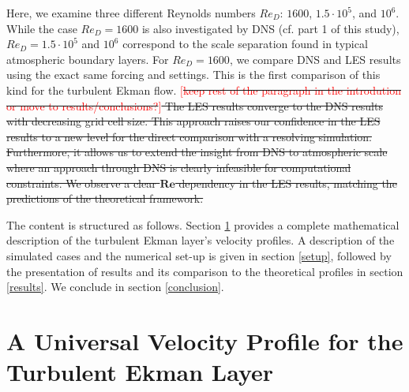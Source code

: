 \documentclass[smallcondensed,draft]{svjour3} %
\newcommand{\todo}[1]{\textcolor{red}{$[$#1$]$}}
\newcommand{\RE}{\mathbf{Re}}
\providecommand{\DIFadd}[1]{{\protect\color{blue}\uwave{#1}}} %
\providecommand{\DIFdel}[1]{{\protect\color{red}\sout{#1}}}                      %
\providecommand{\DIFaddbegin}{} %
\providecommand{\DIFaddend}{} %
\providecommand{\DIFdelbegin}{} %
\providecommand{\DIFdelend}{} %
\newcommand{\DIFscaledelfig}{0.5}
\newlength{\DIFdelgraphicswidth} %
\newlength{\DIFdelgraphicsheight} %
\newcommand{\DIFaddincludegraphics}[2][]{{\color{blue}\fbox{\DIFOincludegraphics[#1]{#2}}}} %
\newcommand{\DIFdelincludegraphics}[2][]{%
\sbox{\DIFdelgraphicsbox}{\DIFOincludegraphics[#1]{#2}}%
\settoboxwidth{\DIFdelgraphicswidth}{\DIFdelgraphicsbox} %
\settoboxtotalheight{\DIFdelgraphicsheight}{\DIFdelgraphicsbox} %
\scalebox{\DIFscaledelfig}{%
\parbox[b]{\DIFdelgraphicswidth}{\usebox{\DIFdelgraphicsbox}\\[-\baselineskip] \rule{\DIFdelgraphicswidth}{0em}}\llap{\resizebox{\DIFdelgraphicswidth}{\DIFdelgraphicsheight}{%
\setlength{\unitlength}{\DIFdelgraphicswidth}%
\begin{picture}(1,1)%
\thicklines\linethickness{2pt} %
{\color[rgb]{1,0,0}\put(0,0){\framebox(1,1){}}}%
{\color[rgb]{1,0,0}\put(0,0){\line( 1,1){1}}}%
{\color[rgb]{1,0,0}\put(0,1){\line(1,-1){1}}}%
\end{picture}%
}\hspace*{3pt}}} %
} %
\DeclareRobustCommand{\DIFaddbegin}{\DIFOaddbegin \let\includegraphics\DIFaddincludegraphics} %
\DeclareRobustCommand{\DIFaddend}{\DIFOaddend \let\includegraphics\DIFOincludegraphics} %
\DeclareRobustCommand{\DIFdelbegin}{\DIFOdelbegin \let\includegraphics\DIFdelincludegraphics} %
\DeclareRobustCommand{\DIFdelend}{\DIFOaddend \let\includegraphics\DIFOincludegraphics} %
\begin{document}
Here, we examine three different Reynolds numbers $Re_D$: $1600$, $1.5\cdot10^5$, and $10^6$. While the case $Re_D=1600$ is also investigated by DNS (cf. part 1 of this study), $Re_D=1.5 \cdot 10^5$ and $10^6$ correspond to the scale separation found in typical atmospheric boundary layers. For $Re_D=1600$, we compare DNS \DIFaddbegin \DIFadd{\mbox{%
\citep{ansorge:2024b} }\hspace{0pt}%
}\DIFaddend and LES results using the exact same forcing and settings. This is the first comparison of this kind for the turbulent Ekman flow. 
\DIFdelbegin \DIFdel{\todo{keep rest of the paragraph in the introdution or move to results/conclusions?} The LES results converge to the DNS results with decreasing grid cell size. This approach raises our confidence in the LES results to a new level for the direct comparison with a resolving simulation. Furthermore, it allows us to extend the insight from DNS to atmospheric scale where an approach through DNS is clearly infeasible for computational constraints. We observe a clear $\RE$ dependency in the LES results, matching the predictions of the theoretical framework.
}\DIFdelend 


The content is structured as follows. Section \ref{universal_profile} provides a complete mathematical description of the turbulent Ekman layer's velocity profiles. A description of the simulated cases and the numerical set-up is given in section \ref{setup}, followed by the presentation of results and its comparison to the theoretical profiles in section \ref{results}. We conclude in section \ref{conclusion}.

\section{A Universal Velocity Profile for the Turbulent Ekman Layer}
\label{universal_profile}
\end{document}
